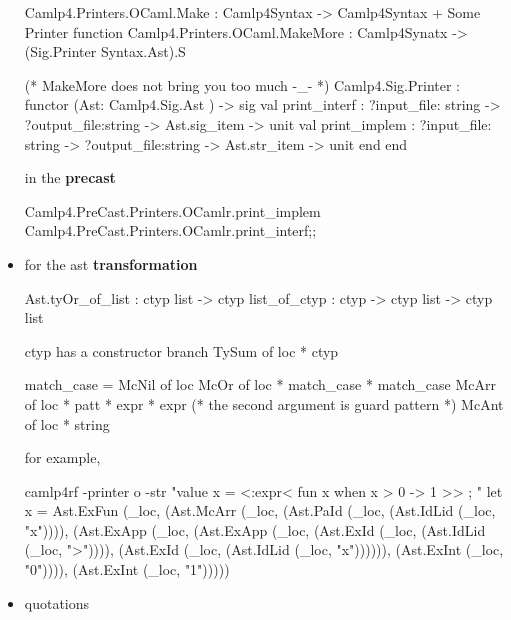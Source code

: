 \begin{itemize}
\begin{ocamlcode}
Camlp4.Printers.OCaml.Make :
 Camlp4Syntax ->  Camlp4Syntax + Some Printer function
Camlp4.Printers.OCaml.MakeMore :
 Camlp4Synatx -> (Sig.Printer Syntax.Ast).S

(* MakeMore does not bring you too much -_- *)
Camlp4.Sig.Printer :
  functor (Ast: Camlp4.Sig.Ast ) ->
    sig
      val print_interf :
        ?input_file: string -> ?output_file:string -> Ast.sig_item -> unit 
      val print_implem :
        ?input_file: string -> ?output_file:string -> Ast.str_item -> unit          end 
  end

\end{ocamlcode}


  in the {\bf precast}
  

\begin{ocamlcode}
Camlp4.PreCast.Printers.OCamlr.print_implem
Camlp4.PreCast.Printers.OCamlr.print_interf;;
\end{ocamlcode}


\item for the ast {\bf transformation }


\begin{ocamlcode}
Ast.tyOr_of_list : ctyp list -> ctyp
list_of_ctyp : ctyp -> ctyp list -> ctyp list
\end{ocamlcode}


  ctyp has a constructor branch   TySum of loc * ctyp


\begin{ocamlcode}
match_case =
  McNil of loc
  McOr of loc * match_case * match_case
  McArr  of loc * patt * expr * expr (* the second argument is guard pattern *)
  McAnt of loc * string 
\end{ocamlcode}


for example,


\begin{ocamlcode}
camlp4rf -printer o -str "value x = <:expr< fun x when x > 0 -> 1 >> ; "
let x =
  Ast.ExFun (_loc,
    (Ast.McArr (_loc, (Ast.PaId (_loc, (Ast.IdLid (_loc, "x")))),
       (Ast.ExApp (_loc,
          (Ast.ExApp (_loc, (Ast.ExId (_loc, (Ast.IdLid (_loc, ">")))),
             (Ast.ExId (_loc, (Ast.IdLid (_loc, "x")))))),
          (Ast.ExInt (_loc, "0")))),
       (Ast.ExInt (_loc, "1")))))
  
\end{ocamlcode}


     
\item quotations



\end{itemize}
